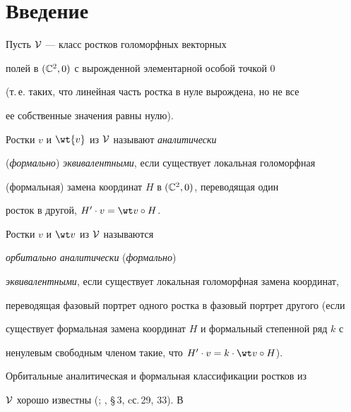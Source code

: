 \maketitle


\label{begin}








\section*{Введение}





Пусть ${\cal V}$ --- класс ростков голоморфных векторных


полей в $(\Bbb C^2,0)$ с вырожденной элементарной особой точкой 0


(т.\,е. таких, что линейная часть ростка в нуле вырождена, но не все


ее собственные значения равны нулю).





Ростки $v$ и $\wt {v}$ из ${\cal V}$ называют {\it аналитически}


({\it формально}) {\it эквивалентными}, если существует локальная голоморфная


(формальная) замена координат $H$ в $(\Bbb C^2,0)$, переводящая один


росток в другой, $H'\cdot v=\wt v\circ H$.





Ростки $v$ и $\wt v$ из ${\cal V}$ называются


{\it орбитально аналитически} ({\it формально})


{\it эквивалентными}, если существует локальная голоморфная замена координат,


переводящая фазовый портрет одного ростка в фазовый портрет другого (если


существует формальная замена координат $H$ и формальный степенной ряд $k$ с


ненулевым свободным членом такие, что $H'\cdot v=k\cdot\wt v\circ H$).





Орбитальные аналитическая и формальная классификации ростков из


${\cal V}$ хорошо известны (\cite{1}; \cite{2}, \S\,3, cс.\,29, 33). В


